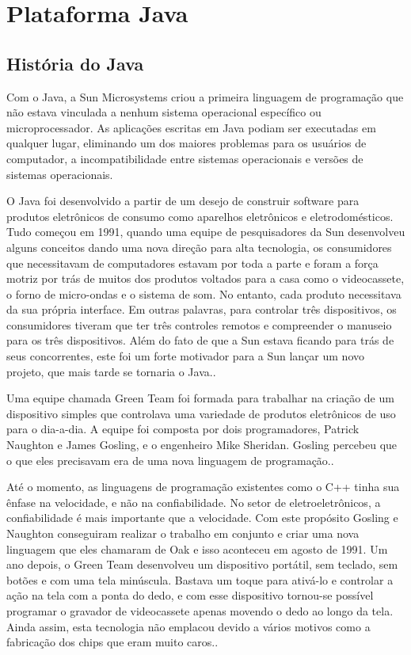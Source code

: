 \chapter{Plataforma Java}

\vspace{-1.9cm}

  \section{História do Java}

  Com o Java, a Sun Microsystems criou a primeira linguagem de programação que não estava vinculada a nenhum sistema operacional específico ou microprocessador. As aplicações escritas em Java podiam ser executadas em qualquer lugar, eliminando um dos maiores problemas para os usuários de computador, a incompatibilidade entre sistemas operacionais e versões de sistemas operacionais.

  O Java foi desenvolvido a partir de um desejo de construir software para produtos eletrônicos de consumo como aparelhos eletrônicos e eletrodomésticos. Tudo começou em 1991, quando uma equipe de pesquisadores da Sun desenvolveu alguns conceitos dando uma nova direção para alta tecnologia, os consumidores que necessitavam de computadores estavam por toda a parte e foram a força motriz por trás de muitos dos produtos voltados para a casa como o videocassete, o forno de micro-ondas e o sistema de som. No entanto, cada produto necessitava da sua própria interface. Em outras palavras, para controlar três dispositivos, os consumidores tiveram que ter três controles remotos e compreender o manuseio para os três dispositivos. Além do fato de que a Sun estava ficando para trás de seus concorrentes, este foi um forte motivador para a Sun lançar um novo projeto, que mais tarde se tornaria o Java.\cite{JavaTimeline:2013}.

  Uma equipe chamada Green Team foi formada para trabalhar na criação de um dispositivo simples que controlava uma variedade de produtos eletrônicos de uso para o dia-a-dia. A equipe foi composta por dois programadores, Patrick Naughton e James Gosling, e o engenheiro Mike Sheridan. Gosling percebeu que o que eles precisavam era de uma nova linguagem de programação.\cite{JavaHistory:2013}.

  Até o momento, as linguagens de programação existentes como o C++ tinha sua ênfase na velocidade, e não na confiabilidade. No setor de eletroeletrônicos, a confiabilidade é mais importante que a velocidade. Com este propósito Gosling e Naughton conseguiram realizar o trabalho em conjunto e criar uma nova linguagem que eles chamaram de Oak e isso aconteceu em agosto de 1991. Um ano depois, o Green Team desenvolveu um dispositivo portátil, sem teclado, sem botões e com uma tela minúscula. Bastava um toque para ativá-lo e controlar a ação na tela com a ponta do dedo, e com esse dispositivo tornou-se possível programar o gravador de videocassete apenas movendo o dedo ao longo da tela. Ainda assim, esta tecnologia não emplacou devido a vários motivos como a fabricação dos chips que eram muito caros.\cite{CoreJava:2010}.


